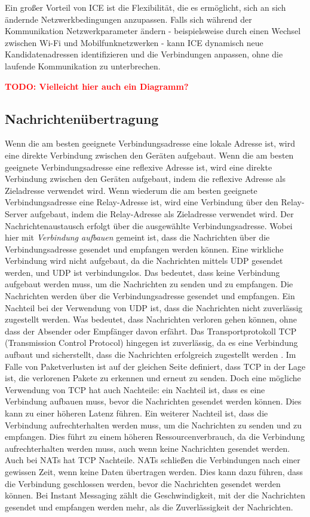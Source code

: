 Ein großer Vorteil von ICE ist die Flexibilität, die es ermöglicht, sich an sich ändernde Netzwerkbedingungen anzupassen. Falls sich während der Kommunikation Netzwerkparameter ändern - beispielsweise durch einen Wechsel zwischen Wi-Fi und Mobilfunknetzwerken - kann ICE dynamisch neue Kandidatenadressen identifizieren und die Verbindungen anpassen, ohne die laufende Kommunikation zu unterbrechen.

\textbf{\textcolor{red}{TODO: Vielleicht hier auch ein Diagramm?}}

\subsection{Nachrichtenübertragung}

Wenn die am besten geeignete Verbindungsadresse eine lokale Adresse ist, wird eine direkte Verbindung zwischen den Geräten aufgebaut. Wenn die am besten geeignete Verbindungsadresse eine reflexive Adresse ist, wird eine direkte Verbindung zwischen den Geräten aufgebaut, indem die reflexive Adresse als Zieladresse verwendet wird. Wenn wiederum die am besten geeignete Verbindungsadresse eine Relay-Adresse ist, wird eine Verbindung über den Relay-Server aufgebaut, indem die Relay-Adresse als Zieladresse verwendet wird. Der Nachrichtenaustausch erfolgt über die ausgewählte Verbindungsadresse. Wobei hier mit \textit{Verbindung aufbauen} gemeint ist, dass die Nachrichten über die Verbindungsadresse gesendet und empfangen werden können. Eine wirkliche Verbindung wird nicht aufgebaut, da die Nachrichten mittels UDP gesendet werden, und UDP ist verbindungslos. Das bedeutet, dass keine Verbindung aufgebaut werden muss, um die Nachrichten zu senden und zu empfangen. Die Nachrichten werden über die Verbindungsadresse gesendet und empfangen. Ein Nachteil bei der Verwendung von UDP ist, dass die Nachrichten nicht zuverlässig zugestellt werden. Was bedeutet, dass Nachrichten verloren gehen können, ohne dass der Absender oder Empfänger davon erfährt. Das Transportprotokoll TCP (Transmission Control Protocol) hingegen ist zuverlässig, da es eine Verbindung aufbaut und sicherstellt, dass die Nachrichten erfolgreich zugestellt werden \parencite[S. 36]{rfc9293_TCP}. Im Falle von Paketverlusten ist auf der gleichen Seite definiert, dass TCP in der Lage ist, die verlorenen Pakete zu erkennen und erneut zu senden.
Doch eine mögliche Verwendung von TCP hat auch Nachteile: ein Nachteil ist, dass es eine Verbindung aufbauen muss, bevor die Nachrichten gesendet werden können. Dies kann zu einer höheren Latenz führen. Ein weiterer Nachteil ist, dass die Verbindung aufrechterhalten werden muss, um die Nachrichten zu senden und zu empfangen. Dies führt zu einem höheren Ressourcenverbrauch, da die Verbindung aufrechterhalten werden muss, auch wenn keine Nachrichten gesendet werden. Auch bei NATs hat TCP Nachteile. NATs schließen die Verbindungen nach einer gewissen Zeit, wenn keine Daten übertragen werden. Dies kann dazu führen, dass die Verbindung geschlossen werden, bevor die Nachrichten gesendet werden können. Bei Instant Messaging zählt die Geschwindigkeit, mit der die Nachrichten gesendet und empfangen werden mehr, als die Zuverlässigkeit der Nachrichten.

